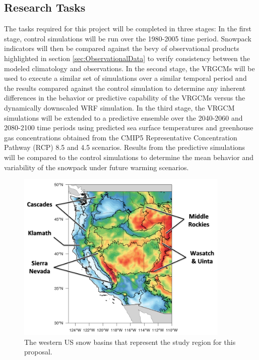 \documentclass[11pt]{article}
\begin{document}
\subsection{Research Tasks}


The tasks required for this project will be completed in three stages: In the first stage, control simulations will be run over the 1980-2005 time period. Snowpack indicators will then be compared against the bevy of observational products highlighted in section \ref{sec:ObservationalData} to verify consistency between the modeled climatology and observations. In the second stage, the VRGCMs will be used to execute a similar set of simulations over a similar temporal period and the results compared against the control simulation to determine any inherent differences in the behavior or predictive capability of the VRGCMs versus the dynamically downscaled WRF simulation. In the third stage, the VRGCM simulations will be extended to a predictive ensemble over the 2040-2060 and 2080-2100 time periods using predicted sea surface temperatures and greenhouse gas concentrations obtained from the CMIP5 Representative Concentration Pathway (RCP) 8.5 and 4.5 scenarios. Results from the predictive simulations will be compared to the control simulations to determine the mean behavior and variability of the snowpack under future warming scenarios.

\begin{figure}
\begin{center}
\includegraphics[width=4in]{SnowBasins.png}
\end{center}
\caption{The western US snow basins that represent the study region for this proposal.} \label{fig:SnowBasins}
\end{figure}
\end{document}
